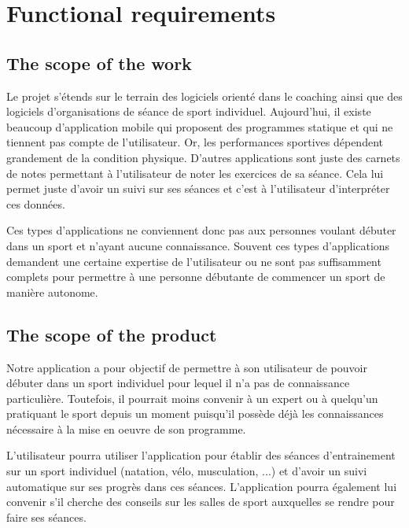\chapter{Functional requirements}

\section{The scope of the work}

Le projet s'étends sur le terrain des logiciels orienté dans le coaching ainsi que des logiciels d'organisations de séance de sport individuel. Aujourd'hui, il existe beaucoup d'application mobile qui proposent des programmes statique et qui ne tiennent pas compte de l'utilisateur. Or, les performances sportives dépendent grandement de la condition physique. D'autres applications sont juste des carnets de notes permettant à l'utilisateur de noter les exercices de sa séance. Cela lui permet juste d'avoir un suivi sur ses séances et c'est à l'utilisateur d'interpréter ces données. 

Ces types d'applications ne conviennent donc pas aux personnes voulant débuter dans un sport et n'ayant aucune connaissance. Souvent ces types d'applications demandent une certaine expertise de l'utilisateur ou ne sont pas suffisamment complets pour permettre à une personne débutante de commencer un sport de manière autonome.   

\section{The scope of the product}

Notre application a pour objectif de permettre à son utilisateur de pouvoir débuter dans un sport individuel pour lequel il n'a pas de connaissance particulière. Toutefois, il pourrait moins convenir à un expert ou à quelqu'un pratiquant le sport depuis un moment puisqu'il possède déjà les connaissances nécessaire à la mise en oeuvre de son programme.

L'utilisateur pourra utiliser l'application pour établir des séances d'entrainement sur un sport individuel (natation, vélo, musculation, ...) et d'avoir un suivi automatique sur ses progrès dans ces séances. L'application pourra également lui convenir s'il cherche des conseils sur les salles de sport auxquelles se rendre pour faire ses séances.

